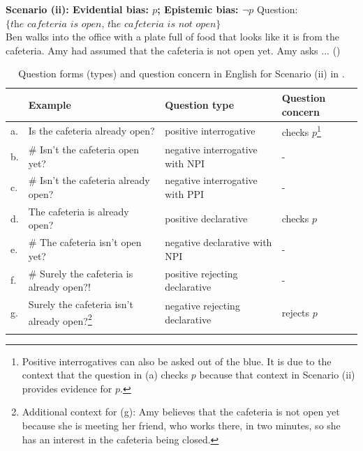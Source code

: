 \documentclass[output=paper,colorlinks,citecolor=brown]{langscibook}
\begin{document}
\ea\label{ex:05:2}\textbf{Scenario (ii): Evidential bias: $p$; Epistemic bias: $\neg p$}
\sn Question: $\{ \textit{the cafeteria is open, the cafeteria is not open} \}$\\
Ben walks into the office with a plate full of food that looks like it is from the cafeteria. Amy had assumed that the cafeteria is not open yet. Amy asks ... ()
\z
\begin{table}
\begin{tabularx}{\textwidth}{lQQl}
\lsptoprule
 &{Example} &  {Question type} &  {Question concern}\\
\midrule
a.&Is the cafeteria already  open? &{positive} interrogative & checks $p$\footnote{Positive interrogatives can also be asked out of the blue. It is due to the context that the question in (a) checks $p$ because that context in Scenario (ii) provides evidence for $p$.}  \\
b.&\# Isn't the cafeteria open  yet? &{negative} interrogative with NPI & - \\
c.&\# Isn't the cafeteria already  open? & {negative interrogative} with PPI & - \\
d.&The cafeteria is already  open? & {positive} declarative & checks $p$ \\
e.&\# The cafeteria isn't open  yet? & {negative} declarative with NPI& -\\
f.&\# Surely the cafeteria is  already open?! & {positive} rejecting declarative & - \\
g.&Surely the cafeteria isn't  already open?\footnote{Additional context for (g): Amy believes that the cafeteria is not open yet because she is meeting her friend, who works there, in two minutes, so she has an interest in the cafeteria being closed.} & {negative} rejecting declarative & rejects $p$ \\
\lspbottomrule
\end{tabularx}
\caption{Question forms (types) and question concern in English for Scenario (ii) in .}
\label{tab:05:2}
\end{table}
\end{document}
